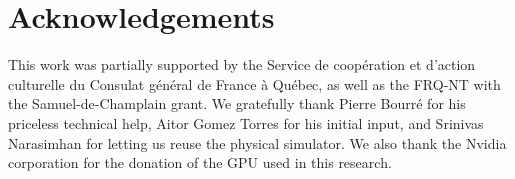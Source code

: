 \documentclass[twocolumn]{svjour3}       %
\begin{document}




\section*{Acknowledgements}

This work was partially supported by the Service de coopération et d'action culturelle du Consulat général de France à Québec, as well as the FRQ-NT with the Samuel-de-Champlain grant. We gratefully thank Pierre Bourré for his priceless technical help, Aitor Gomez Torres for his initial input, and Srinivas Narasimhan for letting us reuse the physical simulator. We also thank the Nvidia corporation for the donation of the GPU used in this research.


\appendix





{\small

}
\end{document}
